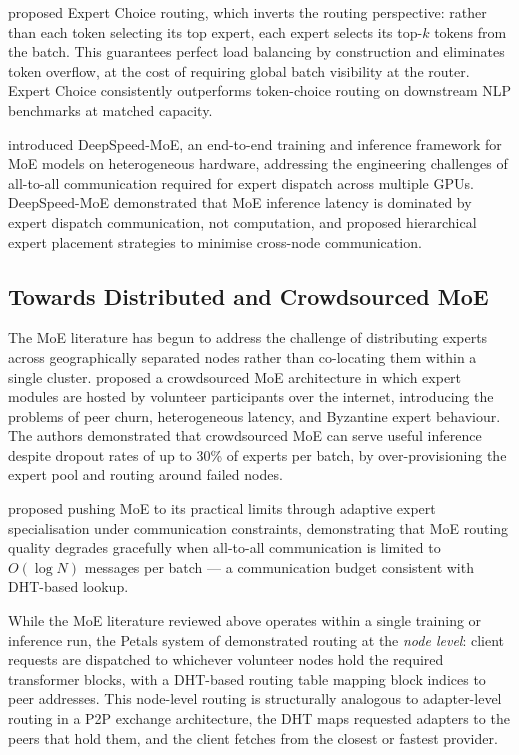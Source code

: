 \citet{Zhou2022} proposed Expert Choice routing, which inverts the routing perspective:
rather than each token selecting its top expert, each expert selects its top-$k$ tokens
from the batch. This guarantees perfect load balancing by construction and eliminates
token overflow, at the cost of requiring global batch visibility at the router.
Expert Choice consistently outperforms token-choice routing on downstream NLP benchmarks
at matched capacity.

\citet{RajbhandariDeepSpeed2022} introduced DeepSpeed-MoE, an end-to-end training and
inference framework for MoE models on heterogeneous hardware, addressing the engineering
challenges of all-to-all communication required for expert dispatch across multiple GPUs.
DeepSpeed-MoE demonstrated that MoE inference latency is dominated by expert dispatch
communication, not computation, and proposed hierarchical expert placement strategies
to minimise cross-node communication.

\subsection{Towards Distributed and Crowdsourced MoE}
\label{sec:moe_routing:distributed}

The MoE literature has begun to address the challenge of distributing experts across
geographically separated nodes rather than co-locating them within a single cluster.
\citet{RyabininCrowdsourced2020} proposed a crowdsourced MoE architecture in which
expert modules are hosted by volunteer participants over the internet, introducing
the problems of peer churn, heterogeneous latency, and Byzantine expert behaviour.
The authors demonstrated that crowdsourced MoE can serve useful inference despite
dropout rates of up to 30\% of experts per batch, by over-provisioning the expert
pool and routing around failed nodes.

\citet{ZadouriPushMoE2024} proposed pushing MoE to its practical limits through
adaptive expert specialisation under communication constraints, demonstrating that
MoE routing quality degrades gracefully when all-to-all communication is limited
to $O(\log N)$ messages per batch --- a communication budget consistent with DHT-based
lookup.

While the MoE literature reviewed above operates within a single training or inference
run, the Petals system of \citet{Borzunov2023} demonstrated routing at the
\textit{node level}: client requests are dispatched to whichever volunteer nodes
hold the required transformer blocks, with a DHT-based routing table mapping block
indices to peer addresses. This node-level routing is structurally analogous to
adapter-level routing in a P2P exchange architecture, the DHT maps requested adapters to
the peers that hold them, and the client fetches from the closest or fastest provider.

